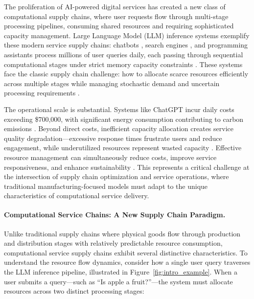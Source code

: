 \documentclass[poms,final,blindrev]{poms1_V1} %
\begin{document}
The proliferation of AI-powered digital services has created a new class of computational supply chains, where user requests flow through multi-stage processing pipelines, consuming shared resources and requiring sophisticated capacity management. Large Language Model (LLM) inference systems exemplify these modern service supply chains: chatbots \citep{anthropic2023claude, bai2023qwen, openai2024gpt4technicalreport, deepseekai2025deepseekr1incentivizingreasoningcapability}, search engines \citep{google2023bard, microsoft2023bing}, and programming assistants \citep{copilot, claude_3_7} process millions of user queries daily, each passing through sequential computational stages under strict memory capacity constraints \citep{devlin2019bert, brown2020language, kaplan2020scaling, ouyang2022training, wei2022emergent, wei2022chain, touvron2023llama}. These systems face the classic supply chain challenge: how to allocate scarce resources efficiently across multiple stages while managing stochastic demand and uncertain processing requirements \citep{garcia2019estimation}.

The operational scale is substantial. Systems like ChatGPT incur daily costs exceeding \$700,000, with significant energy consumption contributing to carbon emissions \citep{patel2023peeling, patterson2021carbon}. Beyond direct costs, inefficient capacity allocation creates service quality degradation—excessive response times frustrate users and reduce engagement, while underutilized resources represent wasted capacity \citep{strubell2019energy, desislavov2021compute}. Effective resource management can simultaneously reduce costs, improve service responsiveness, and enhance sustainability \citep{wu2022sustainable}. This represents a critical challenge at the intersection of supply chain optimization and service operations, where traditional manufacturing-focused models must adapt to the unique characteristics of computational service delivery.

\paragraph{Computational Service Chains: A New Supply Chain Paradigm.}
Unlike traditional supply chains where physical goods flow through production and distribution stages with relatively predictable resource consumption, computational service supply chains exhibit several distinctive characteristics. To understand the resource flow dynamics, consider how a single user query traverses the LLM inference pipeline, illustrated in Figure~\ref{fig:intro_example}. When a user submits a query—such as ``Is apple a fruit?''—the system must allocate resources across two distinct processing stages:
\end{document}
